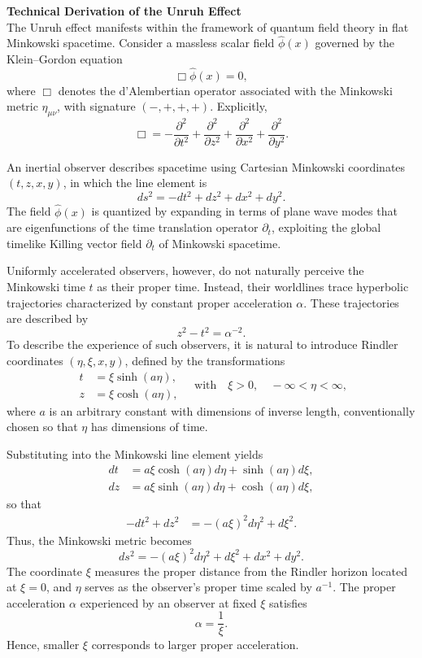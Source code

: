 \begin{technical}
{\Large\textbf{Technical Derivation of the Unruh Effect}}\\[0.7em]

The Unruh effect manifests within the framework of quantum field theory in flat Minkowski spacetime. Consider a massless scalar field $\hat{\phi}(x)$ governed by the Klein–Gordon equation
\[
\Box \hat{\phi}(x) = 0,
\]
where $\Box$ denotes the d'Alembertian operator associated with the Minkowski metric $\eta_{\mu\nu}$, with signature $(-,+,+,+)$. Explicitly,
\[
\Box = -\frac{\partial^2}{\partial t^2} + \frac{\partial^2}{\partial z^2} + \frac{\partial^2}{\partial x^2} + \frac{\partial^2}{\partial y^2}.
\]

An inertial observer describes spacetime using Cartesian Minkowski coordinates $(t, z, x, y)$, in which the line element is
\[
ds^2 = -dt^2 + dz^2 + dx^2 + dy^2.
\]
The field $\hat{\phi}(x)$ is quantized by expanding in terms of plane wave modes that are eigenfunctions of the time translation operator $\partial_t$, exploiting the global timelike Killing vector field $\partial_t$ of Minkowski spacetime.

Uniformly accelerated observers, however, do not naturally perceive the Minkowski time $t$ as their proper time. Instead, their worldlines trace hyperbolic trajectories characterized by constant proper acceleration $\alpha$. These trajectories are described by
\[
z^2 - t^2 = \alpha^{-2}.
\]
To describe the experience of such observers, it is natural to introduce Rindler coordinates $(\eta, \xi, x, y)$, defined by the transformations
\[
\begin{aligned}
t &= \xi \sinh(a\eta), \\
z &= \xi \cosh(a\eta),
\end{aligned}
\quad \text{with} \quad \xi > 0, \quad -\infty < \eta < \infty,
\]
where $a$ is an arbitrary constant with dimensions of inverse length, conventionally chosen so that $\eta$ has dimensions of time. 

Substituting into the Minkowski line element yields
\[
\begin{aligned}
dt &= a \xi \cosh(a\eta) d\eta + \sinh(a\eta) d\xi, \\
dz &= a \xi \sinh(a\eta) d\eta + \cosh(a\eta) d\xi,
\end{aligned}
\]
so that
\[
\begin{aligned}
-dt^2 + dz^2 &= -(a\xi)^2 d\eta^2 + d\xi^2.
\end{aligned}
\]
Thus, the Minkowski metric becomes
\[
ds^2 = - (a\xi)^2 d\eta^2 + d\xi^2 + dx^2 + dy^2.
\]
The coordinate $\xi$ measures the proper distance from the Rindler horizon located at $\xi = 0$, and $\eta$ serves as the observer's proper time scaled by $a^{-1}$. The proper acceleration $\alpha$ experienced by an observer at fixed $\xi$ satisfies
\[
\alpha = \frac{1}{\xi}.
\]
Hence, smaller $\xi$ corresponds to larger proper acceleration.


\end{technical}
